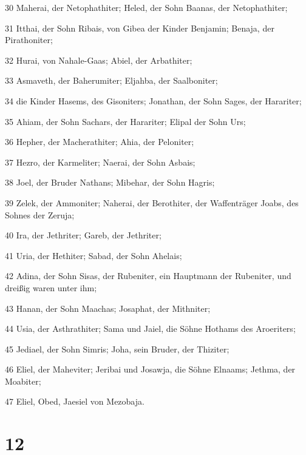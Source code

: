 \par 30 Maherai, der Netophathiter; Heled, der Sohn Baanas, der Netophathiter;
\par 31 Itthai, der Sohn Ribais, von Gibea der Kinder Benjamin; Benaja, der Pirathoniter;
\par 32 Hurai, von Nahale-Gaas; Abiel, der Arbathiter;
\par 33 Asmaveth, der Baherumiter; Eljahba, der Saalboniter;
\par 34 die Kinder Hasems, des Gisoniters; Jonathan, der Sohn Sages, der Harariter;
\par 35 Ahiam, der Sohn Sachars, der Harariter; Elipal der Sohn Urs;
\par 36 Hepher, der Macherathiter; Ahia, der Peloniter;
\par 37 Hezro, der Karmeliter; Naerai, der Sohn Asbais;
\par 38 Joel, der Bruder Nathans; Mibehar, der Sohn Hagris;
\par 39 Zelek, der Ammoniter; Naherai, der Berothiter, der Waffenträger Joabs, des Sohnes der Zeruja;
\par 40 Ira, der Jethriter; Gareb, der Jethriter;
\par 41 Uria, der Hethiter; Sabad, der Sohn Ahelais;
\par 42 Adina, der Sohn Sisas, der Rubeniter, ein Hauptmann der Rubeniter, und dreißig waren unter ihm;
\par 43 Hanan, der Sohn Maachas; Josaphat, der Mithniter;
\par 44 Usia, der Asthrathiter; Sama und Jaiel, die Söhne Hothams des Aroeriters;
\par 45 Jediael, der Sohn Simris; Joha, sein Bruder, der Thiziter;
\par 46 Eliel, der Maheviter; Jeribai und Josawja, die Söhne Elnaams; Jethma, der Moabiter;
\par 47 Eliel, Obed, Jaesiel von Mezobaja.

\chapter{12}


